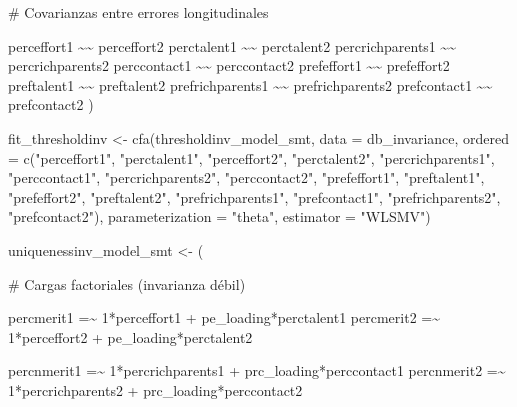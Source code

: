 \documentclass[
  12pt,
]{article}
\newenvironment{Shaded}{\begin{snugshade}}{\end{snugshade}}
\newcommand{\AttributeTok}[1]{\textcolor[rgb]{0.40,0.45,0.13}{#1}}
\newcommand{\FunctionTok}[1]{\textcolor[rgb]{0.28,0.35,0.67}{#1}}
\newcommand{\NormalTok}[1]{\textcolor[rgb]{0.00,0.23,0.31}{#1}}
\newcommand{\OtherTok}[1]{\textcolor[rgb]{0.00,0.23,0.31}{#1}}
\newcommand{\StringTok}[1]{\textcolor[rgb]{0.13,0.47,0.30}{#1}}
\begin{document}
\begin{Shaded}
\begin{Highlighting}[]
\StringTok{\# Covarianzas entre errores longitudinales}

\StringTok{perceffort1 \textasciitilde{}\textasciitilde{} perceffort2}
\StringTok{perctalent1 \textasciitilde{}\textasciitilde{} perctalent2}
\StringTok{percrichparents1 \textasciitilde{}\textasciitilde{} percrichparents2}
\StringTok{perccontact1 \textasciitilde{}\textasciitilde{} perccontact2}
\StringTok{prefeffort1 \textasciitilde{}\textasciitilde{} prefeffort2}
\StringTok{preftalent1 \textasciitilde{}\textasciitilde{} preftalent2}
\StringTok{prefrichparents1 \textasciitilde{}\textasciitilde{} prefrichparents2}
\StringTok{prefcontact1 \textasciitilde{}\textasciitilde{} prefcontact2}
\StringTok{\textquotesingle{}}\NormalTok{)}

\NormalTok{fit\_thresholdinv }\OtherTok{\textless{}{-}} \FunctionTok{cfa}\NormalTok{(thresholdinv\_model\_smt, }\AttributeTok{data =}\NormalTok{ db\_invariance,}
                        \AttributeTok{ordered =} \FunctionTok{c}\NormalTok{(}\StringTok{"perceffort1"}\NormalTok{, }\StringTok{"perctalent1"}\NormalTok{, }\StringTok{"perceffort2"}\NormalTok{, }\StringTok{"perctalent2"}\NormalTok{,}
                                    \StringTok{"percrichparents1"}\NormalTok{, }\StringTok{"perccontact1"}\NormalTok{, }\StringTok{"percrichparents2"}\NormalTok{, }\StringTok{"perccontact2"}\NormalTok{,}
                                    \StringTok{"prefeffort1"}\NormalTok{, }\StringTok{"preftalent1"}\NormalTok{, }\StringTok{"prefeffort2"}\NormalTok{, }\StringTok{"preftalent2"}\NormalTok{,}
                                    \StringTok{"prefrichparents1"}\NormalTok{, }\StringTok{"prefcontact1"}\NormalTok{, }\StringTok{"prefrichparents2"}\NormalTok{, }\StringTok{"prefcontact2"}\NormalTok{),}
                        \AttributeTok{parameterization =} \StringTok{"theta"}\NormalTok{,}
                        \AttributeTok{estimator =} \StringTok{"WLSMV"}\NormalTok{)}

\NormalTok{uniquenessinv\_model\_smt }\OtherTok{\textless{}{-}}\NormalTok{ (}\StringTok{\textquotesingle{}}

\StringTok{\# Cargas factoriales (invarianza débil)}

\StringTok{percmerit1  =\textasciitilde{} 1*perceffort1 + pe\_loading*perctalent1}
\StringTok{percmerit2  =\textasciitilde{} 1*perceffort2 + pe\_loading*perctalent2}

\StringTok{percnmerit1 =\textasciitilde{} 1*percrichparents1 + prc\_loading*perccontact1}
\StringTok{percnmerit2 =\textasciitilde{} 1*percrichparents2 + prc\_loading*perccontact2}


\end{Highlighting}
\end{Shaded}
\end{document}
